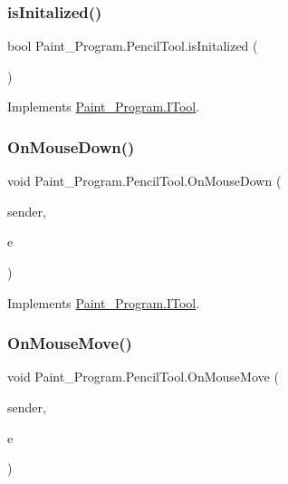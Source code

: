 \subsubsection{\texorpdfstring{is\+Initalized()}{isInitalized()}}
{\footnotesize\ttfamily bool Paint\+\_\+\+Program.\+Pencil\+Tool.\+is\+Initalized (\begin{DoxyParamCaption}{ }\end{DoxyParamCaption})\hspace{0.3cm}{\ttfamily [inline]}}



Implements \mbox{\hyperlink{interface_paint___program_1_1_i_tool_a951b844bcbf47a6c306104fa86be7a5d}{Paint\+\_\+\+Program.\+I\+Tool}}.

\mbox{\label{class_paint___program_1_1_pencil_tool_a559e17e6afc05dde7278d4b69b05b12d}} 
\subsubsection{\texorpdfstring{On\+Mouse\+Down()}{OnMouseDown()}}
{\footnotesize\ttfamily void Paint\+\_\+\+Program.\+Pencil\+Tool.\+On\+Mouse\+Down (\begin{DoxyParamCaption}\item[{object}]{sender,  }\item[{Mouse\+Event\+Args}]{e }\end{DoxyParamCaption})\hspace{0.3cm}{\ttfamily [inline]}}



Implements \mbox{\hyperlink{interface_paint___program_1_1_i_tool_a73d8797f4f2b1e0d8efe8aadcd44e840}{Paint\+\_\+\+Program.\+I\+Tool}}.

\mbox{\label{class_paint___program_1_1_pencil_tool_a05d86241cc76eaf2abaa94b6ac3f5cfe}} 
\subsubsection{\texorpdfstring{On\+Mouse\+Move()}{OnMouseMove()}}
{\footnotesize\ttfamily void Paint\+\_\+\+Program.\+Pencil\+Tool.\+On\+Mouse\+Move (\begin{DoxyParamCaption}\item[{object}]{sender,  }\item[{Mouse\+Event\+Args}]{e }\end{DoxyParamCaption})\hspace{0.3cm}{\ttfamily [inline]}}



